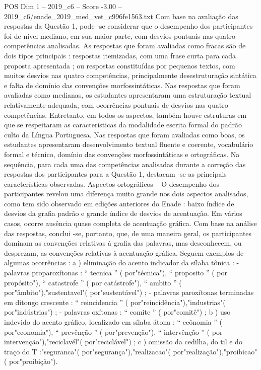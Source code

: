 \begin{textsample}{POS Dim 1 – 2019\_c6 – Score -3.00 – 2019\_c6/enade\_2019\_med\_vet\_c996fe1563.txt}
Com base na avaliação das respostas da Questão 1, pode -se considerar que o desempenho dos participantes foi de nível mediano, em sua maior parte, com desvios pontuais nas quatro competências analisadas.
As respostas que foram avaliadas como fracas são de dois tipos principais : respostas itemizadas, com uma frase curta para cada proposta apresentada ; ou respostas constituídas por pequenos textos, com muitos desvios nas quatro competências, principalmente desestruturação sintática e falta de domínio das convenções morfossintáticas.
Nas respostas que foram avaliadas como medianas, os estudantes apresentaram uma estruturação textual relativamente adequada, com ocorrências pontuais de desvios nas quatro competências.
Entretanto, em todos os aspectos, também houve estruturas em que se respeitaram as características da modalidade escrita formal do padrão culto da Língua Portuguesa.
Nas respostas que foram avaliadas como boas, os estudantes apresentaram desenvolvimento textual fluente e coerente, vocabulário formal e técnico, domínio das convenções morfossintáticas e ortográficas.
Na sequência, para cada uma das competências analisadas durante a correção das respostas dos participantes para a Questão 1, destacam -se as principais características observadas.
Aspectos ortográficos – O desempenho dos participantes revelou uma diferença muito grande nos dois aspectos analisados, como tem sido observado em edições anteriores do Enade : baixo índice de desvios da grafia padrão e grande índice de desvios de acentuação.
Em vários casos, ocorre ausência quase completa de acentuação gráfica.
Com base na análise das respostas, conclui -se, portanto, que, de uma maneira geral, os participantes dominam as convenções relativas à grafia das palavras, mas desconhecem, ou desprezam, as convenções relativas à acentuação gráfica.
Seguem exemplos de algumas ocorrências : a ) eliminação do acento indicador da sílaba tônica : - palavras proparoxítonas : “ tecnica ” ( por"técnica"), “ proposito ” ( por propósito"), “ catastrofe ” ( por catástrofe"), “ ambito ” ( por"âmbito"),"sustentavel"( por"sustentável") ; - palavras paroxítonas terminadas em ditongo crescente : “ reincidencia ” ( por"reincidência"),"industrias"( por"indústrias") ; - palavras oxítonas : “ comite ” ( por"comitê") ; b ) uso indevido do acento gráfico, localizado em sílaba átona : “ ecônomia ” ( por"economia"), “ prevênção ” ( por"prevenção"), “ intervênção ” ( por intervenção"),"reciclavél"( por"reciclável") ; c ) omissão da cedilha, do til e do traço do T :"seguranca"( por"segurança"),"realizacao"( por"realização"),"proibicao"( por"proibição").

\end{textsample}
